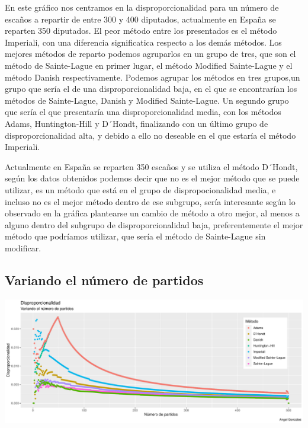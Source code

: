 \documentclass[12pt,a4paper,]{book}
\numberwithin{dummy}{section}
\theoremstyle{ocrenumbox}
\theoremstyle{blacknumex}
\theoremstyle{blacknumbox}
\theoremstyle{ocrenum}
\theoremstyle{ocrenum}
\begin{document}
En este gráfico nos centramos en la disproporcionalidad para un número
de escaños a repartir de entre 300 y 400 diputados, actualmente en
España se reparten 350 diputados. El peor método entre los presentados
es el método Imperiali, con una diferencia significatica respecto a los
demás métodos. Los mejores métodos de reparto podemos agruparlos en un
grupo de tres, que son el método de Sainte-Lague en primer lugar, el
método Modified Sainte-Lague y el método Danish respectivamente. Podemos
agrupar los métodos en tres grupos,un grupo que sería el de una
disproporcionalidad baja, en el que se encontrarían los métodos de
Sainte-Lague, Danish y Modified Sainte-Lague. Un segundo grupo que sería
el que presentaría una disproporcionalidad media, con los métodos Adams,
Huntington-Hill y D´Hondt, finalizando con un último grupo de
disproporcionalidad alta, y debido a ello no deseable en el que estaría
el método Imperiali.

Actualmente en España se reparten 350 escaños y se utiliza el método
D´Hondt, según los datos obtenidos podemos decir que no es el mejor
método que se puede utilizar, es un método que está en el grupo de
dispropocionalidad media, e incluso no es el mejor método dentro de ese
subgrupo, sería interesante según lo observado en la gráfica plantearse
un cambio de método a otro mejor, al menos a alguno dentro del subgrupo
de disproporcionalidad baja, preferentemente el mejor método que
podríamos utilizar, que sería el método de Sainte-Lague sin modificar.

\hypertarget{variando-el-nuxfamero-de-partidos}{%
\subsection{Variando el número de
partidos}\label{variando-el-nuxfamero-de-partidos}}

\begin{center}\includegraphics[width=0.95\linewidth]{figurasR/unnamed-chunk-44-1} \end{center}
\end{document}
